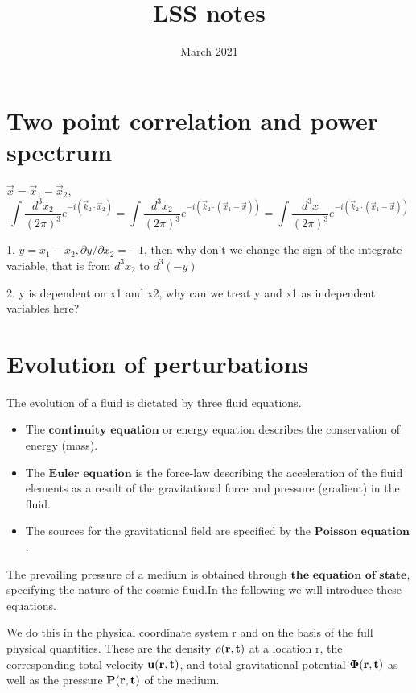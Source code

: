 \documentclass[onecolumn]{emulateapj}
\title{LSS notes}
\date{March 2021}
\begin{document}
\maketitle

\section{Two point correlation and power spectrum}

$\vec{x} = \vec{x}_1 - \vec{x}_2$,
$$\int \frac{d^3x_2}{(2\pi)^3} e^{-i(\vec{k}_2 \cdot \vec{x}_2 )} = \int \frac{d^3x_2}{(2\pi)^3} e^{-i \left(\vec{k}_2 \cdot (\vec{x}_1-\vec{x}) \right)}  =  \int \frac{d^3x}{(2\pi)^3} e^{-i \left(\vec{k}_2 \cdot (\vec{x}_1-\vec{x}) \right)} $$

1. $y = x_1 - x_2, \partial y / \partial x_2 = -1$, then why don't we change the sign of the integrate variable, that is from $d^3x_2$ to $d^3(-y)$

2. y is dependent on x1 and x2, why can we treat y and x1 as independent variables here?


\section{Evolution of perturbations}

The evolution of a fluid is dictated by three fluid equations. 
\begin{itemize}
    \item The $\textbf{continuity equation}$ or energy equation describes the conservation of energy (mass). 
    \item The $\textbf{Euler equation}$ is the force-law describing the acceleration of the fluid elements as a result of the gravitational force and pressure (gradient) in the fluid.
    \item The sources for the gravitational field are specified by the $\textbf{Poisson equation}$.
\end{itemize}
The prevailing pressure of a medium is obtained through $\textbf{the equation of state}$, specifying the nature of the cosmic fluid.In the following we will introduce these equations. 

We do this in the physical coordinate system r and on the basis of the full physical quantities. These are the density $\bf \rho(r,t)$ at a location r, the corresponding total velocity $\bf u(r,t)$, and total gravitational potential $\bf \Phi(r,t)$ as well as the pressure $\bf P(r,t)$ of the medium.

\citep{adams1995hitchhiker}



\end{document}
